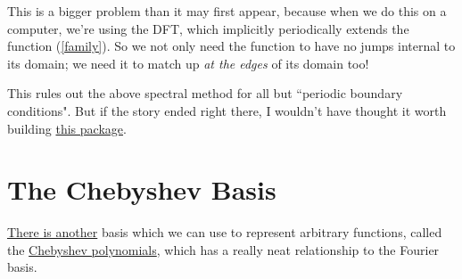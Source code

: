 \documentclass[10pt]{article}
\begin{document}
This is a bigger problem than it may first appear, because when we do this on a computer, we're using the DFT, which implicitly periodically extends the function (\autoref{family}). So we not only need the function to have no jumps internal to its domain; we need it to match up \textit{at the edges} of its domain too!

This rules out the above spectral method for all but ``periodic boundary conditions"\cite{kutz}. But if the story ended right there, I wouldn't have thought it worth building \href{https://pypi.org/project/spectral-derivatives/}{this package}.

\section{The Chebyshev Basis}

\href{https://www.youtube.com/watch?v=HloOBYPwlmU}{There is another} basis which we can use to represent arbitrary functions, called the \href{https://epubs.siam.org/doi/epdf/10.1137/1.9780898719598.ch8}{Chebyshev polynomials}\cite{trefethen8}, which has a really neat relationship to the Fourier basis.
\end{document}
